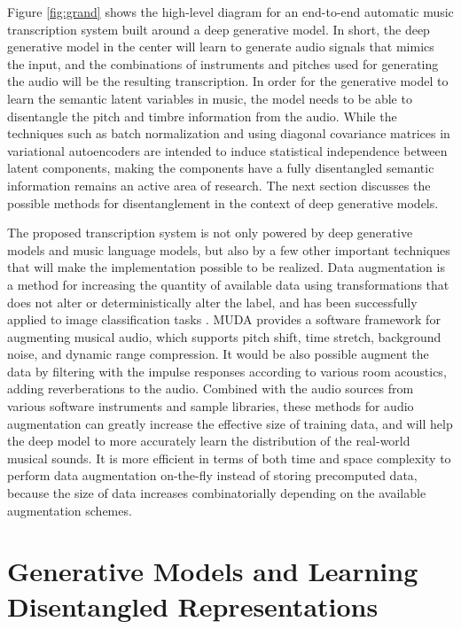 Figure \ref{fig:grand} shows the high-level diagram for an end-to-end automatic music transcription system built around a deep generative model.
In short, the deep generative model in the center will learn to generate audio signals that mimics the input, and the combinations of instruments and pitches used for generating the audio will be the resulting transcription.
In order for the generative model to learn the semantic latent variables in music, the model needs to be able to disentangle the pitch and timbre information from the audio.
While the techniques such as batch normalization and using diagonal covariance matrices in variational autoencoders are intended to induce statistical independence between latent components,
making the components have a fully disentangled semantic information remains an active area of research.
The next section discusses the possible methods for disentanglement in the context of deep generative models.

The proposed transcription system is not only powered by deep generative models and music language models, but also by a few other important techniques that will make the implementation possible to be realized.
Data augmentation is a method for increasing the quantity of available data using transformations that does not alter or deterministically alter the label, and has been successfully applied to image classification tasks  \cite{krizhevsky2012imagenet}. MUDA \cite{mcfee2015muda} provides a software framework for augmenting musical audio, which supports pitch shift, time stretch, background noise, and dynamic range compression.
It would be also possible augment the data by filtering with the impulse responses according to various room acoustics, adding reverberations to the audio.
Combined with the audio sources from various software instruments and sample libraries, these methods for audio augmentation can greatly increase the effective size of training data, and will help the deep model to more accurately learn the distribution of the real-world musical sounds.
It is more efficient in terms of both time and space complexity to perform data augmentation on-the-fly instead of storing precomputed data, because the size of data increases combinatorially depending on the available augmentation schemes.


\section{Generative Models and Learning Disentangled Representations}

